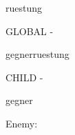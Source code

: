 \documentclass[12pt]{pnpprep}
\begin{document}
\begin{blueprint}{ruestung}


    \begin{render}
        GLOBAL - \namevalue
    \end{render}

\end{blueprint}


\begin{blueprint}{gegnerruestung}


    \begin{render}
        CHILD - \namevalue
    \end{render}

\end{blueprint}


\begin{blueprint}{gegner}



    \begin{render}
        Enemy: \namevalue
        \par
        \renderChildren
    \end{render}

\end{blueprint}


\begin{gegner}


    \begin{ruestung}
    \end{ruestung}

\end{gegner}
\end{document}

